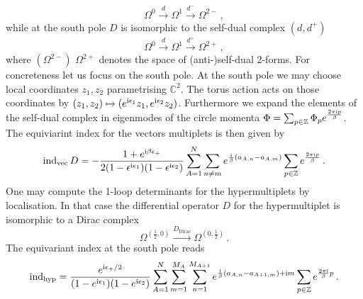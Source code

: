 \documentclass[main.tex]{subfiles}
\begin{document}
\begin{equation}\label{eqn:northcmplx}
\Omega^0\xrightarrow{d}\Omega^1\xrightarrow{d^-}\Omega^{2-}\,,
\end{equation}
while at the south pole $D$ is isomorphic to the self-dual complex $(d,d^+)$
\begin{equation}\label{eqn:southcmplx}
\Omega^0\xrightarrow{d}\Omega^1\xrightarrow{d^+}\Omega^{2+}\,,
\end{equation}
where $(\Omega^{2-})$ $\Omega^{2+}$ denotes the space of (anti-)self-dual 2-forms. For concreteness let us focus on the south pole. At the south pole we may choose local coordinates $z_1,z_2$ parametrising $\mathbb{C}^2$. The torus action acts on those coordinates by \newline$(z_1,z_2)\mapsto(e^{\mathrm{i}\epsilon_1}z_1,e^{\mathrm{i}\epsilon_2}z_2)$. Furthermore we expand the elements of the self-dual complex in eigenmodes of the circle momenta $\Phi=\sum_{p\in\mathbb{Z}}\Phi_pe^{\frac{2\pi\mathrm{i} p}{\beta}}$. The equiviarint index for the vectors multiplets is then given by
\begin{equation}\label{eqn:indexsouth}
\operatorname{ind}_{\text{vec}} D=-\frac{1+e^{\mathrm{i}\beta\epsilon_+}}{2(1-\epsilon^{\mathrm{i}\epsilon_1})(1-\epsilon^{\mathrm{i}\epsilon_2})}\sum_{A=1}^N\sum_{n\neq m}e^{\frac{\mathrm{i}}{\beta}(a_{A,n}-a_{A,m})}\sum_{p\in\mathbb{Z}}e^{\frac{2\pi\mathrm{i} p}{\beta}}\,.
\end{equation} 
One may compute the 1-loop determinants for the hypermultiplets by localisation. In that case the differential operator $D$ for the hypermultiplet is isomorphic to a Dirac complex
\begin{equation}\label{eqn:Diraccmplx}
\Omega^{\left(\frac{1}{2},0\right)}\xrightarrow{D_{\text{Dirac}}} \Omega^{\left(0,\frac{1}{2}\right)}\,.
\end{equation} 
The equivariant index at the south pole reads
\begin{equation}\label{eqn:hypindexsouth}
\operatorname{ind}_{\text{hyp}}=\frac{e^{\mathrm{i}\epsilon_+/2}}{(1-e^{\mathrm{i}\epsilon_1})(1-e^{\mathrm{i}\epsilon_2})}\sum_{A=1}^N\sum_{m=1}^{M_A}\sum_{n=1}^{M_{A+1}}e^{\frac{\mathrm{i} }{\beta}(a_{A,n}- a_{A+1,m})+\mathrm{i} m}\sum_{p\in\mathbb{Z}}e^{\frac{2\pi\mathrm{i}}{\beta}p}\,.
\end{equation}
\end{document}
